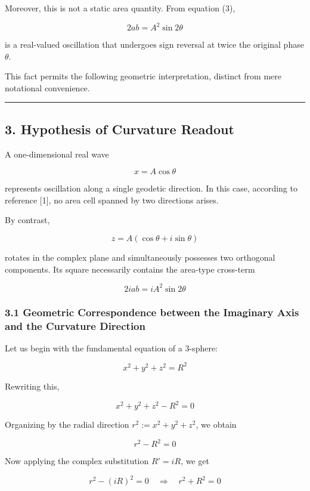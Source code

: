 \documentclass[
  a4paper,
]{article}
\begin{document}
Moreover, this is not a static area quantity. From equation (3),

\[2ab=A^2\sin2\theta\]

is a real-valued oscillation that undergoes sign reversal at twice the
original phase \(\theta\).

This fact permits the following geometric interpretation, distinct from
mere notational convenience.

\begin{center}\rule{0.5\linewidth}{0.5pt}\end{center}

\subsection{3. Hypothesis of Curvature
Readout}\label{hypothesis-of-curvature-readout}

A one-dimensional real wave

\[x=A\cos\theta\]

represents oscillation along a single geodetic direction. In this case,
according to reference {[}1{]}, no area cell spanned by two directions
arises.

By contrast,

\[z=A(\cos\theta+i\sin\theta)\]

rotates in the complex plane and simultaneously possesses two orthogonal
components. Its square necessarily contains the area-type cross-term

\[2iab=iA^2\sin2\theta\]

\subsubsection{3.1 Geometric Correspondence between the Imaginary Axis
and the Curvature
Direction}\label{geometric-correspondence-between-the-imaginary-axis-and-the-curvature-direction}

Let us begin with the fundamental equation of a 3-sphere:

\[x^2 + y^2 + z^2 = R^2\]

Rewriting this,

\[x^2 + y^2 + z^2 - R^2 = 0\]

Organizing by the radial direction \(r^2 := x^2 + y^2 + z^2\), we obtain

\[r^2 - R^2 = 0\]

Now applying the complex substitution \(R' = iR\), we get

\[r^2 - (iR)^2 = 0 \quad \Rightarrow \quad r^2 + R^2 = 0\]
\end{document}
